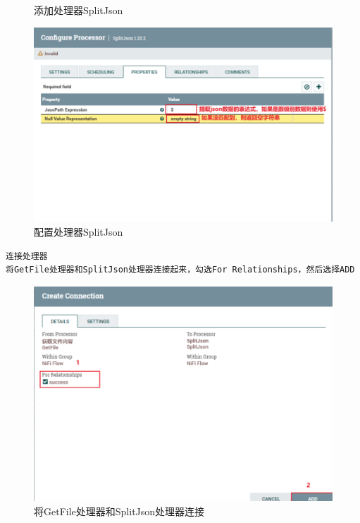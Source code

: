 \documentclass{article}
\begin{document}
\begin{enumerate}
\begin{figure}[htp]
        \caption{添加处理器SplitJson}
        \label{pic6}
    \end{figure}
    \begin{figure}[htp]
        \centering
        \includegraphics[width=13cm]{split配置.png}
        \caption{配置处理器SplitJson}
        \label{pic6}
    \end{figure}
    \newpage
    \begin{lstlisting}
连接处理器
将GetFile处理器和SplitJson处理器连接起来，勾选For Relationships，然后选择ADD
    \end{lstlisting}
    \begin{figure}[htp]
        \centering
        \includegraphics[width=13cm]{连接1.png}
        \caption{将GetFile处理器和SplitJson处理器连接}
        \label{pic6}
    \end{figure}
    \newpage
    \begin{lstlisting}

\end{lstlisting}
\end{enumerate}
\end{document}
